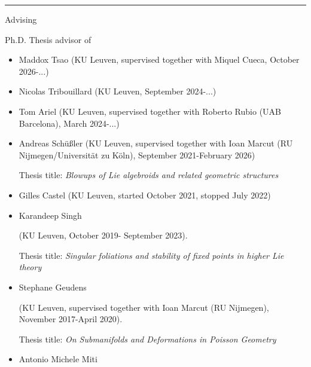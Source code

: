 \documentclass[12p]{resume}
\begin{document}
 


 
\hrule{}

\begin{category}{Advising}



\citemnobullet Ph.D. Thesis advisor of 
\begin{itemize}

\item Maddox Tsao (KU Leuven, supervised together with Miquel Cueca, October 2026-...)

\item Nicolas Tribouillard   (KU Leuven, September 2024-...)

\item Tom Ariel (KU Leuven, supervised together with Roberto Rubio (UAB Barcelona), March 2024-...) 

 
 \item   Andreas Sch\"u{\ss}ler (KU Leuven, supervised together with Ioan Marcut (RU Nijmegen/Universit\"at zu K\"oln), September 2021-February 2026) 
 
Thesis title: \emph{Blowups of Lie algebroids and related geometric structures}

   \item Gilles Castel (KU Leuven, started October 2021, stopped July 2022)
   \item Karandeep Singh 
   
   (KU Leuven, October 2019- September 2023).
   
 Thesis title:  \emph{Singular foliations and stability of fixed points in higher Lie theory} 
   \item Stephane Geudens 
   
   (KU Leuven, supervised together with Ioan Marcut (RU Nijmegen), November 2017-April 2020). 
   
 Thesis title:  \emph{On Submanifolds and Deformations in Poisson Geometry}   
   
   \item Antonio Michele Miti 
   

\end{itemize}
\end{category}
\end{document}
